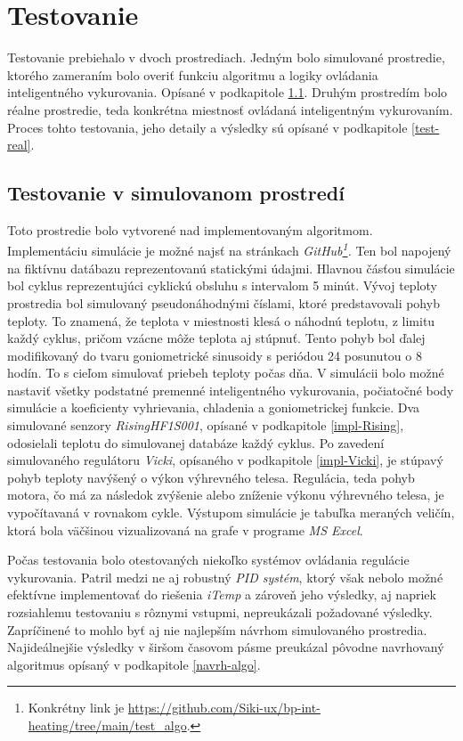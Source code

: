 \chapter{Testovanie}\label{test}
Testovanie prebiehalo v dvoch prostrediach. 
Jedným bolo simulované prostredie, ktorého zameraním bolo overiť funkciu algoritmu a logiky ovládania inteligentného vykurovania. Opísané v podkapitole \ref{test-sim}.
Druhým prostredím bolo réalne prostredie, teda konkrétna miestnosť ovládaná inteligentným vykurovaním. 
Proces tohto testovania, jeho detaily a výsledky sú opísané v podkapitole \ref{test-real}.

\section{Testovanie v simulovanom prostredí}\label{test-sim}
Toto prostredie bolo vytvorené nad implementovaným algoritmom. 
Implementáciu simulácie je možné najsť na stránkach \emph{GitHub\footnote{Konkrétny link je \url{https://github.com/Siki-ux/bp-int-heating/tree/main/test_algo}.}.}
Ten bol napojený na fiktívnu datábazu reprezentovanú statickými údajmi. 
Hlavnou čásťou simulácie bol cyklus reprezentujúci cyklickú obsluhu s intervalom 5 minút. 
Vývoj teploty prostredia bol simulovaný pseudonáhodnými číslami, ktoré predstavovali pohyb teploty.
To znamená, že teplota v miestnosti klesá o náhodnú teplotu, z limitu každý cyklus, pričom vzácne môže teplota aj stúpnuť.
Tento pohyb bol ďalej modifikovaný do tvaru goniometrické sinusoidy s periódou 24 posunutou o 8 hodín.
To s cieľom simulovať priebeh teploty počas dňa.
V simulácii bolo možné nastaviť všetky podstatné premenné inteligentného vykurovania, počiatočné body simulácie a koeficienty vyhrievania, chladenia a goniometrickej funkcie.
Dva simulované senzory \emph{RisingHF1S001}, opísané v podkapitole \ref{impl-Rising}, odosielali teplotu do simulovanej databáze každý cyklus.
Po zavedení simulovaného regulátoru \emph{Vicki}, opísaného v podkapitole \ref{impl-Vicki}, je stúpavý pohyb teploty navýšený o výkon výhrevného telesa.
Regulácia, teda pohyb motora, čo má za následok zvýšenie alebo zníženie výkonu výhrevného telesa, je vypočítavaná v rovnakom cykle.
Výstupom simulácie je tabuľka meraných veličín, ktorá bola väčšinou vizualizovaná na grafe v programe \emph{MS Excel}.

Počas testovania bolo otestovaných niekoľko systémov ovládania regulácie vykurovania. 
Patril medzi ne aj robustný \emph{PID systém}, ktorý však nebolo možné efektívne implementovať do riešenia \emph{iTemp} a zároveň jeho výsledky, aj napriek rozsiahlemu testovaniu s rôznymi vstupmi, nepreukázali požadované výsledky.
Zapríčinené to mohlo byť aj nie najlepším návrhom simulovaného prostredia.
Najideálnejšie výsledky v širšom časovom pásme preukázal pôvodne navrhovaný algoritmus opísaný v podkapitole \ref{navrh-algo}.

